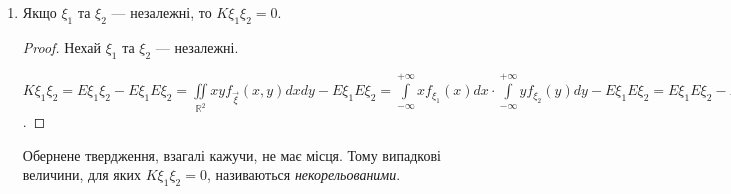 \begin{enumerate}
\begin{proof}
\begin{enumerate}[label=\Roman*.]
            $\left|K\xi_1\xi_2\right| \leq \sigma_{\xi_1} \sigma_{\xi_2}$.

            \item Введемо нормовані центровані випадкові величини $\xi_H = \frac{\xi - E\xi}
            {\sigma_\xi}$, $E\xi_H =0$, $D\xi_H = 1$.

            $E(\xi_{1H} \pm \xi_{2H})^2 \geq 0 \Leftrightarrow 
            E(\xi^2_{1H}\pm2\xi_{1H}\xi_{2H}+\xi^2_{2H}) \geq 0 
            \Leftrightarrow 2 \pm 
            2\frac{K\xi_1\xi_2}{\sigma_{\xi_1}\sigma_{\xi_2}} \geq 0 
            \Leftrightarrow $

            $\left|K\xi_1\xi_2\right| \leq \sigma_{\xi_1} \sigma_{\xi_2}$.
        \end{enumerate}
    \end{proof}
    \item Якщо $\xi_1$ та $\xi_2$ --- незалежні, то $K\xi_1\xi_2 = 0$.
    \begin{proof}
        Нехай $\xi_1$ та $\xi_2$ --- незалежні.

        $K\xi_1\xi_2 = E\xi_1\xi_2 - E\xi_1E\xi_2 = 
        \iint\limits_{\mathbb{R}^2} xy f_{\vec{\xi}}(x,y)dx dy 
        - E\xi_1E\xi_2
        = \int\limits_{-\infty}^{+\infty}xf_{\xi_1}(x)dx \cdot
        \int\limits_{-\infty}^{+\infty}yf_{\xi_2}(y)dy
        - E\xi_1E\xi_2 = 
        E\xi_1E\xi_2 - E\xi_1E\xi_2 = 0$.
    \end{proof}

    Обернене твердження, взагалі кажучи, не має місця. Тому випадкові 
    величини, для яких $K\xi_1\xi_2 = 0$, називаються 
    \emph{некорельованими}.
\end{enumerate}

